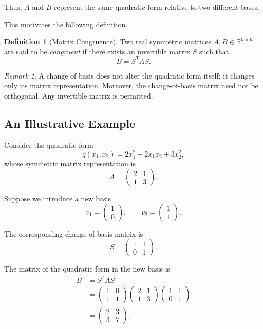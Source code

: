 \documentclass[11pt]{article}
\theoremstyle{definition}
\newtheorem{definition}[theorem]{Definition}
\theoremstyle{remark}
\newtheorem{remark}[theorem]{Remark}
\begin{document}
Thus, $A$ and $B$ represent the same quadratic
form relative to two different bases.

This motivates the following definition.

\begin{definition}[Matrix Congruence]
Two real symmetric matrices
$A,B\in\mathbb{R}^{n\times n}$
are said to be \emph{congruent} if there exists
an invertible matrix $S$ such that
\[
    \boxed{B=S^TAS}.
\]
\end{definition}

\begin{remark}
A change of basis does not alter the quadratic
form itself; it changes only its matrix
representation. Moreover, the change-of-basis
matrix need not be orthogonal. Any invertible
matrix is permitted.
\end{remark}

\subsection{An Illustrative Example}

Consider the quadratic form
\[
    q(x_1,x_2)=2x_1^2+2x_1x_2+3x_2^2,
\]
whose symmetric matrix representation is
\[
    A=
    \begin{pmatrix}
        2&1\\
        1&3
    \end{pmatrix}.
\]

Suppose we introduce a new basis
\[
    v_1=
    \begin{pmatrix}1\\0\end{pmatrix},
    \qquad
    v_2=
    \begin{pmatrix}1\\1\end{pmatrix}.
\]

The corresponding change-of-basis matrix is
\[
    S=
    \begin{pmatrix}
        1&1\\
        0&1
    \end{pmatrix}.
\]

The matrix of the quadratic form in the new
basis is
\[
\begin{aligned}
    B
    &=S^TAS\\
    &=
    \begin{pmatrix}
        1&0\\
        1&1
    \end{pmatrix}
    \begin{pmatrix}
        2&1\\
        1&3
    \end{pmatrix}
    \begin{pmatrix}
        1&1\\
        0&1
    \end{pmatrix}\\[6pt]
    &=
    \boxed{
    \begin{pmatrix}
        2&3\\
        3&7
    \end{pmatrix}}.
\end{aligned}
\]
\end{document}
